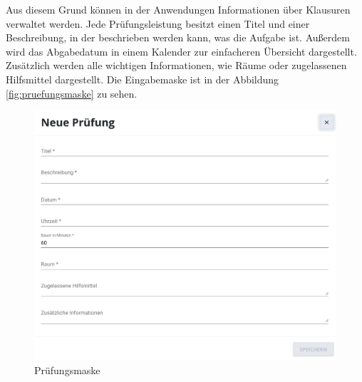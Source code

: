 Aus diesem Grund können in der Anwendungen Informationen über Klausuren verwaltet werden.
Jede Prüfungsleistung besitzt einen Titel und einer Beschreibung, in der beschrieben werden kann, was die Aufgabe ist.
Außerdem wird das Abgabedatum in einem Kalender zur einfacheren Übersicht dargestellt.
Zusätzlich werden alle wichtigen Informationen, wie Räume oder zugelassenen Hilfsmittel dargestellt.
Die Eingabemaske ist in der Abbildung \autoref{fig:pruefungsmaske} zu sehen.
\begin{figure}[h] 
    \centering
    \includegraphics[width=.7\textwidth]{img/Pruefung_hinzugefuegen.png}
    \caption{Prüfungsmaske}
    \label{fig:pruefungsmaske}
\end{figure}
